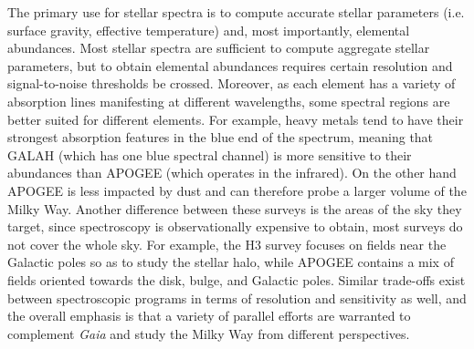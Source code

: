 The primary use for stellar spectra is to compute accurate stellar parameters (i.e. surface gravity, effective temperature) and, most importantly, elemental abundances. Most stellar spectra are sufficient to compute aggregate stellar parameters, but to obtain elemental abundances requires certain resolution and signal-to-noise thresholds be crossed. Moreover, as each element has a variety of absorption lines manifesting at different wavelengths, some spectral regions are better suited for different elements. For example, heavy metals tend to have their strongest absorption features in the blue end of the spectrum, meaning that GALAH (which has one blue spectral channel) is more sensitive to their abundances than APOGEE (which operates in the infrared). On the other hand APOGEE is less impacted by dust and can therefore probe a larger volume of the Milky Way. Another difference between these surveys is the areas of the sky they target, since spectroscopy is observationally expensive to obtain, most surveys do not cover the whole sky. For example, the H3 survey focuses on fields near the Galactic poles so as to study the stellar halo, while APOGEE contains a mix of fields oriented towards the disk, bulge, and Galactic poles. Similar trade-offs exist between spectroscopic programs in terms of resolution and sensitivity as well, and the overall emphasis is that a variety of parallel efforts are warranted to complement \textit{Gaia} and study the Milky Way from different perspectives.

